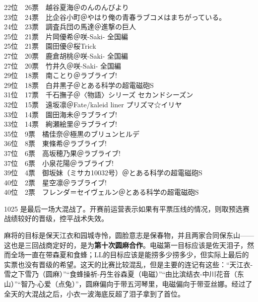 {    22位　26票　越谷夏海＠のんのんびより                                      \\
    23位　24票　比企谷小町＠やはり俺の青春ラブコメはまちがっている。          \\
    24位　23票　調査兵団の馬達＠進撃の巨人                                    \\
    25位　21票　片岡優希＠咲-Saki- 全国編                                     \\
    25位　21票　園田優＠桜Trick                                               \\
    27位　20票　鹿倉胡桃＠咲-Saki- 全国編                                     \\
    27位　20票　竹井久＠咲-Saki- 全国編                                       \\
    29位　18票　南ことり＠ラブライブ!                                         \\
    29位　18票　白井黒子＠とある科学の超電磁砲S                               \\
    31位　17票　千石撫子＠〈物語〉シリーズ セカンドシーズン                   \\
    32位　15票　遠坂凛＠Fate/kaleid liner プリズマ☆イリヤ                    \\
    33位　14票　園田海未＠ラブライブ!                                         \\
    33位　14票　絢瀬絵里＠ラブライブ!                                         \\
    35位　9票　橘佳奈＠極黒のブリュンヒルデ                                   \\
    36位　8票　東條希＠ラブライブ!                                            \\
    37位　6票　高坂穂乃果＠ラブライブ!                                        \\
    37位　6票　小泉花陽＠ラブライブ!                                          \\
    39位　4票　御坂妹（ミサカ10032号）＠とある科学の超電磁砲S                 \\
    40位　2票　星空凛＠ラブライブ!                                            \\
    40位　2票　フレンダ＝セイヴェルン＠とある科学の超電磁砲S
}

1025 是最后一场大混战了。开赛前运营表示如果有平票压线的情况，则取预选赛战绩较好的晋级，控平战术失效。

麻将的目标是保天江衣和园城寺怜，圆脸意志是保春物，并且两家合同保东山——这也是三回战商定好的，是为\textbf{第十次圆麻合作}。电磁第一目标应该是佐天泪子，然而全场一直在带森夏和食蜂；LL的目标应该是能捞多少捞多少，但实际上最后的实票也没有晋级的希望。这天的比赛比较混乱，但是主要的连记有这些：“天江衣-雪之下雪乃（圆麻）”“食蜂操祈-丹生谷森夏（电磁）”“由比滨结衣-中川花音（东山）”“智乃-心爱（点兔）”，圆麻偏向于带五河琴里，电磁偏向于带亚丝娜。经过了全天的大混战之后，小衣一波海底反超了泪子拿到了首位。

